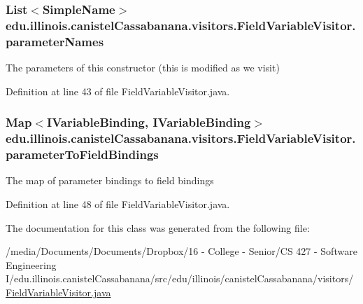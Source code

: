 \hypertarget{classedu_1_1illinois_1_1canistelCassabanana_1_1visitors_1_1FieldVariableVisitor_a76b871cecb125d753d2940effd0012fc}{
\subsubsection[{parameterNames}]{\setlength{\rightskip}{0pt plus 5cm}List$<$SimpleName$>$ {\bf edu.illinois.canistelCassabanana.visitors.FieldVariableVisitor.parameterNames}}}
\label{classedu_1_1illinois_1_1canistelCassabanana_1_1visitors_1_1FieldVariableVisitor_a76b871cecb125d753d2940effd0012fc}
The parameters of this constructor (this is modified as we visit) 

Definition at line 43 of file FieldVariableVisitor.java.

\hypertarget{classedu_1_1illinois_1_1canistelCassabanana_1_1visitors_1_1FieldVariableVisitor_aea653ab0a4a19d426ffe1a11474fe331}{
\subsubsection[{parameterToFieldBindings}]{\setlength{\rightskip}{0pt plus 5cm}Map$<$IVariableBinding, IVariableBinding$>$ {\bf edu.illinois.canistelCassabanana.visitors.FieldVariableVisitor.parameterToFieldBindings}}}
\label{classedu_1_1illinois_1_1canistelCassabanana_1_1visitors_1_1FieldVariableVisitor_aea653ab0a4a19d426ffe1a11474fe331}
The map of parameter bindings to field bindings 

Definition at line 48 of file FieldVariableVisitor.java.



The documentation for this class was generated from the following file:\begin{DoxyCompactItemize}
\item 
/media/Documents/Documents/Dropbox/16 -\/ College -\/ Senior/CS 427 -\/ Software Engineering I/edu.illinois.canistelCassabanana/src/edu/illinois/canistelCassabanana/visitors/\hyperlink{FieldVariableVisitor_8java}{FieldVariableVisitor.java}\end{DoxyCompactItemize}

